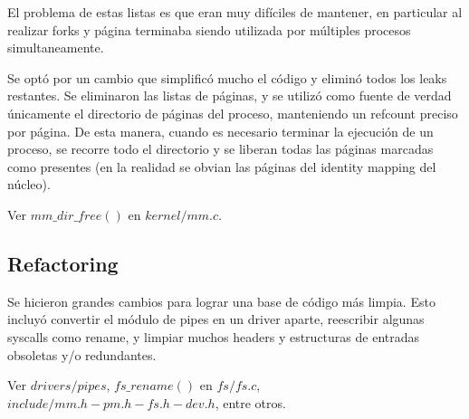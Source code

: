 El problema de estas listas es que eran muy difíciles de mantener, en particular
al realizar forks y página terminaba siendo utilizada por múltiples
procesos simultaneamente.

Se optó por un cambio que simplificó mucho el código y eliminó todos los leaks
restantes. Se eliminaron las listas de páginas, y se utilizó como fuente de
verdad únicamente el directorio de páginas del proceso, manteniendo un refcount
preciso por página. De esta manera, cuando es necesario terminar la ejecución de
un proceso, se recorre todo el directorio y se liberan todas las páginas marcadas
como presentes (en la realidad se obvian las páginas del identity mapping del
núcleo).

Ver $mm\_dir\_free()$ en $kernel/mm.c$.

\subsection{Refactoring}

Se hicieron grandes cambios para lograr una base de código más limpia. Esto
incluyó convertir el módulo de pipes en un driver aparte, reescribir algunas
syscalls como rename, y limpiar muchos headers y estructuras de entradas
obsoletas y/o redundantes.

Ver $drivers/pipes$, $fs\_rename()$ en $fs/fs.c$, $include/mm.h-pm.h-fs.h-dev.h$,
entre otros.
